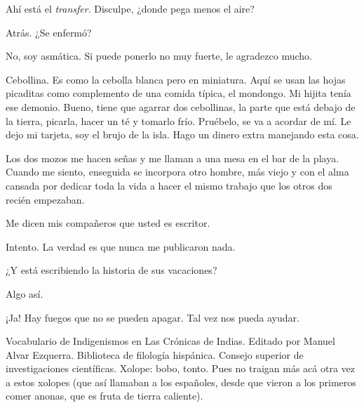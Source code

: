 \documentclass[12pt,twoside,openright,a5paper]{book}
\begin{document}
\hrulefill\hspace{0.2cm} \decofourleft\decofourright \hspace{0.2cm} \hrulefill
\vspace{0.5cm}

Ahí está el \emph{transfer}. Disculpe, ¿donde pega menos el aire?

Atrás. ¿Se enfermó?

No, soy asmática. Si puede ponerlo no muy fuerte, le agradezco mucho.

Cebollina. Es como la cebolla blanca pero en miniatura. Aquí se usan las
hojas picaditas como complemento de una comida típica, el mondongo. Mi
hijita tenía ese demonio. Bueno, tiene que agarrar
dos cebollinas, la parte que está debajo de la tierra, picarla, hacer
un té y tomarlo frío. Pruébelo, se va a acordar de mí. Le dejo mi tarjeta,
soy el brujo de la isla. Hago un dinero extra manejando esta cosa.

\vspace{0.5cm}

\hrulefill\hspace{0.2cm} \decofourleft\decofourright \hspace{0.2cm} \hrulefill
\vspace{0.5cm}

Los dos mozos me hacen señas y me llaman a una mesa en el bar de la
playa. Cuando me siento, enseguida se incorpora otro hombre, más viejo
y con el alma cansada por dedicar toda la vida a hacer el mismo trabajo
que los otros dos recién empezaban.

Me dicen mis compañeros que usted es escritor.

Intento. La verdad es que nunca me publicaron nada.

¿Y está escribiendo la historia de sus vacaciones?

Algo así.

¡Ja! Hay fuegos que no se pueden apagar. Tal vez nos pueda ayudar.


\vspace{0.5cm}

\hrulefill\hspace{0.2cm} \decofourleft\decofourright \hspace{0.2cm} \hrulefill
\vspace{0.5cm}

Vocabulario de Indigenismos en Las Crónicas de Indias. Editado por  Manuel
Alvar Ezquerra. Biblioteca de filología hispánica. Consejo superior de
investigaciones científicas. Xolope: bobo, tonto. Pues no traigan más
acá otra vez a estos xolopes (que así llamaban a los españoles, desde
que vieron a los primeros comer anonas, que es fruta de tierra caliente).
\end{document}
